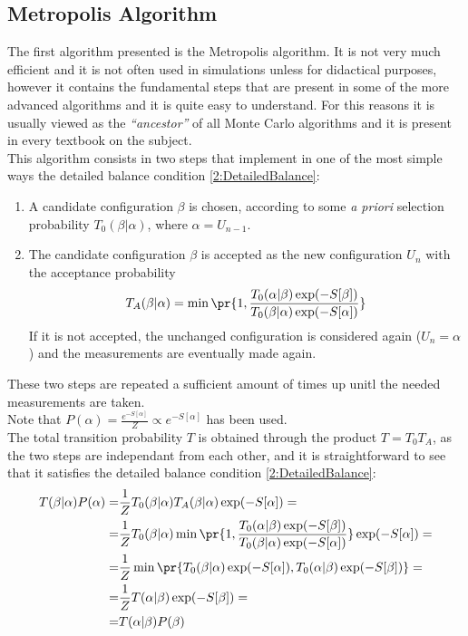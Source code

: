 \subsection{Metropolis Algorithm}
The first algorithm presented is the Metropolis algorithm. It is not very much efficient and it is not often used in simulations unless for didactical purposes, however it contains the fundamental steps that are present in some of the more advanced algorithms and it is quite easy to understand.
For this reasons it is usually viewed as the \emph{``ancestor''} of all Monte Carlo algorithms and it is present in every textbook on the subject.\\
This algorithm consists in two steps that implement in one of the most simple ways the detailed balance condition \eqref{2:DetailedBalance}:
\begin{enumerate}[label=\arabic*)]
    \item A candidate configuration $\beta$ is chosen, according to some \emph{a priori} selection probability $T_0(\beta|\alpha)$, where $\alpha=U_{n-1}$.
    \item The candidate configuration $\beta$ is accepted as the new configuration $U_n$ with the acceptance probability
          \begin{equation}
              T_A(\beta|\alpha) = \min\pr{1,\frac{T_0(\alpha|\beta)\exp(-S[\beta])}{T_0(\beta|\alpha)\exp(-S[\alpha])}} \label{2:MetropolisAccProb}
          \end{equation}
          If it is not accepted, the unchanged configuration is considered again ($U_n=\alpha$) and the measurements are eventually made again.
\end{enumerate}
These two steps are repeated a sufficient amount of times up unitl the needed measurements are taken.\\
Note that $P(\alpha) = \frac{e^{-S[\alpha]}}{Z} \varpropto e^{-S[\alpha]}$ has been used.\\
The total transition probability $T$ is obtained through the product $T=T_0T_A$, as the two steps are independant from each other, and it is straightforward to see that it satisfies the detailed balance condition \eqref{2:DetailedBalance}:
\begin{align*}
    T(\beta|\alpha)P(\alpha) =& \frac1Z T_0(\beta|\alpha)T_A(\beta|\alpha)\exp(-S[\alpha]) = \\
    =& \frac1Z T_0(\beta|\alpha)\min\pr{1,\frac{T_0(\alpha|\beta)\exp(-S[\beta])}{T_0(\beta|\alpha)\exp(-S[\alpha])}}\exp(-S[\alpha]) = \\
    =& \frac1Z \min\pr{T_0(\beta|\alpha)\exp(-S[\alpha]), T_0(\alpha|\beta)\exp(-S[\beta])} = \\
    =& \frac1Z T(\alpha|\beta)\exp(-S[\beta]) = \\
    =& T(\alpha|\beta)P(\beta)
\end{align*}
